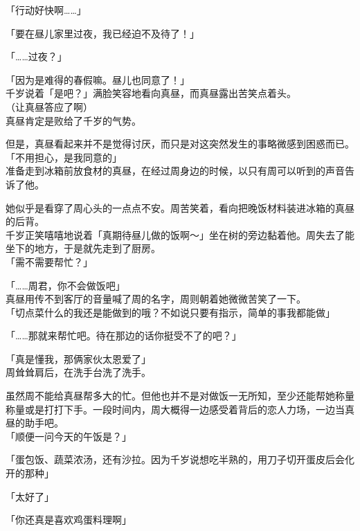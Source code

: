 「行动好快啊……」

「要在昼儿家里过夜，我已经迫不及待了！」

「……过夜？」

「因为是难得的春假嘛。昼儿也同意了！」\\

千岁说着「是吧？」满脸笑容地看向真昼，而真昼露出苦笑点着头。\\

（让真昼答应了啊）\\

真昼肯定是败给了千岁的气势。

但是，真昼看起来并不是觉得讨厌，而只是对这突然发生的事略微感到困惑而已。\\

「不用担心，是我同意的」\\

准备走到冰箱前放食材的真昼，在经过周身边的时候，以只有周可以听到的声音告诉了他。

她似乎是看穿了周心头的一点点不安。周苦笑着，看向把晚饭材料装进冰箱的真昼的后背。\\

千岁正笑嘻嘻地说着「真期待昼儿做的饭啊～」坐在树的旁边黏着他。周失去了能坐下的地方，于是就先走到了厨房。\\

「需不需要帮忙？」

「……周君，你不会做饭吧」\\

真昼用传不到客厅的音量喊了周的名字，周则朝着她微微苦笑了一下。\\

「切点菜什么的我还是能做到的哦？不如说只要有指示，简单的事我都能做」

「……那就来帮忙吧。待在那边的话你挺受不了的吧？」

「真是懂我，那俩家伙太恩爱了」\\

周耸耸肩后，在洗手台洗了洗手。

虽然周不能给真昼帮多大的忙。但他也并不是对做饭一无所知，至少还能帮她称量称量或是打打下手。一段时间内，周大概得一边感受着背后的恋人力场，一边当真昼的助手吧。\\

「顺便一问今天的午饭是？」

「蛋包饭、蔬菜浓汤，还有沙拉。因为千岁说想吃半熟的，用刀子切开蛋皮后会化开的那种」

「太好了」

「你还真是喜欢鸡蛋料理啊」

